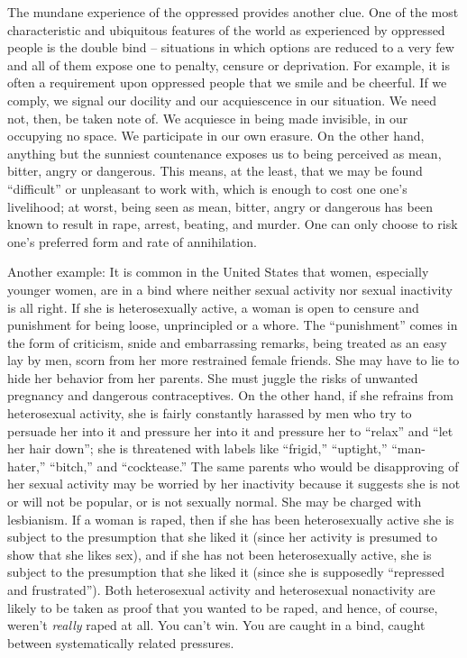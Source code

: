 \documentclass{article}
\begin{document}
The mundane experience of the oppressed provides another clue. One of the most
characteristic and ubiquitous features of the world as experienced by oppressed
people is the double bind -- situations in which options are reduced to a very
few and all of them expose one to penalty, censure or deprivation. For example,
it is often a requirement upon oppressed people that we smile and be cheerful.
If we comply, we signal our docility and our acquiescence in our situation. We
need not, then, be taken note of. We acquiesce in being made invisible, in our
occupying no space. We participate in our own erasure. On the other hand,
anything but the sunniest countenance exposes us to being perceived as mean,
bitter, angry or dangerous. This means, at the least, that we may be found
``difficult'' or unpleasant to work with, which is enough to cost one one's
livelihood; at worst, being seen as mean, bitter, angry or dangerous has been
known to result in rape, arrest, beating, and murder. One can only choose to
risk one's preferred form and rate of annihilation.

Another example: It is common in the United States that women, especially
younger women, are in a bind where neither sexual activity nor sexual
inactivity is all right. If she is heterosexually active, a woman is open to
censure and punishment for being loose, unprincipled or a whore. The
``punishment'' comes in the form of criticism, snide and embarrassing remarks,
being treated as an easy lay by men, scorn from her more restrained female
friends. She may have to lie to hide her behavior from her parents. She must
juggle the risks of unwanted pregnancy and dangerous contraceptives. On the
other hand, if she refrains from heterosexual activity, she is fairly
constantly harassed by men who try to persuade her into it and pressure her
into it and pressure her to ``relax'' and ``let her hair down''; she is
threatened with labels like ``frigid,'' ``uptight,'' ``man-hater,'' ``bitch,''
and ``cocktease.'' The same parents who would be disapproving of her sexual
activity may be worried by her inactivity because it suggests she is not or
will not be popular, or is not sexually normal. She may be charged with
lesbianism.  If a woman is raped, then if she has been heterosexually active
she is subject to the presumption that she liked it (since her activity is
presumed to show that she likes sex), and if she has not been heterosexually
active, she is subject to the presumption that she liked it (since she is
supposedly ``repressed and frustrated''). Both heterosexual activity and
heterosexual nonactivity are likely to be taken as proof that you wanted to be
raped, and hence, of course, weren't \emph{really} raped at all. You can't win.
You are caught in a bind, caught between systematically related pressures.
\end{document}
